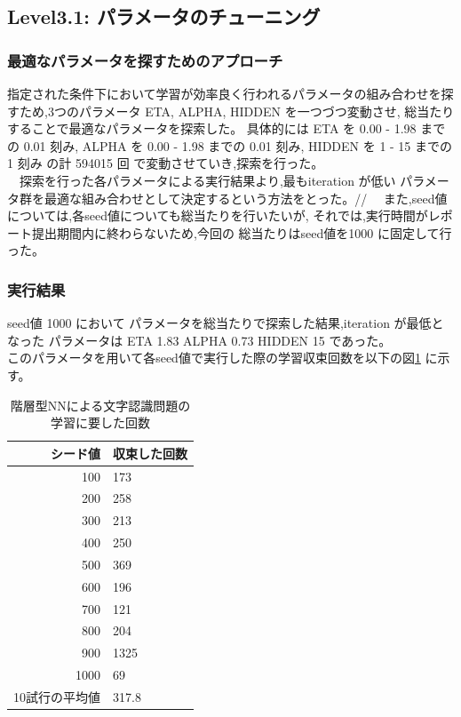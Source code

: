 \subsection{Level3.1: パラメータのチューニング}
\subsubsection{最適なパラメータを探すためのアプローチ}
指定された条件下において学習が効率良く行われるパラメータの組み合わせを探
すため,3つのパラメータ ETA, ALPHA, HIDDEN を一つづつ変動させ,
総当たりすることで最適なパラメータを探索した。
具体的には 
ETA を 0.00 - 1.98 までの 0.01 刻み,
ALPHA を 0.00 - 1.98 までの 0.01 刻み,
HIDDEN を 1 - 15 までの 1 刻み 
の計 594015 回 で変動させていき,探索を行った。\\
　探索を行った各パラメータによる実行結果より,最もiteration が低い
パラメータ群を最適な組み合わせとして決定するという方法をとった。//
　また,seed値については,各seed値についても総当たりを行いたいが,
それでは,実行時間がレポート提出期間内に終わらないため,今回の
総当たりはseed値を1000 に固定して行った。

\subsubsection{実行結果}
seed値 1000 において パラメータを総当たりで探索した結果,iteration が最低となった
パラメータは ETA 1.83 ALPHA 0.73 HIDDEN 15 であった。\\
このパラメータを用いて各seed値で実行した際の学習収束回数を以下の図\ref{table:level3}
に示す。

\begin{table}[htb]
 \begin{center}
  \caption{階層型NNによる文字認識問題の学習に要した回数}
  \label{table:level3}
  \begin{tabular}[htb]{r|l} \hline
   シード値 & 収束した回数 \\ \hline \hline
   100 & 173 \\ \hline
   200 & 258 \\ \hline
   300 & 213 \\ \hline
   400 & 250 \\ \hline
   500 & 369 \\ \hline
   600 & 196 \\ \hline
   700 & 121 \\ \hline
   800 & 204 \\ \hline
   900 & 1325 \\ \hline
   1000 & 69 \\ \hline \hline
   10試行の平均値 & 317.8 \\ \hline
  \end{tabular}
 \end{center}
\end{table}

